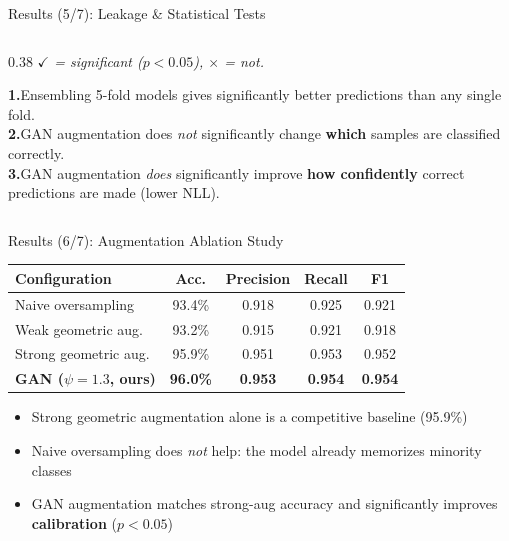 \documentclass[aspectratio=169]{beamer}
\begin{document}
\begin{frame}{Results (5/7): Leakage \& Statistical Tests}
\begin{columns}[T]
\begin{column}{0.38\textwidth}
      \vspace{0.1em}
      {\tiny\itshape \textcolor{mygreen}{$\checkmark$} = significant ($p<0.05$),
      \textcolor{myred}{$\times$} = not.}
      \vspace{0.4em}
      \begin{block}{}
        \scriptsize
        \textbf{1.}\;Ensembling 5-fold models gives significantly better predictions than any single fold.\\[2pt]
        \textbf{2.}\;GAN augmentation does \emph{not} significantly change \textbf{which} samples are classified correctly.\\[2pt]
        \textbf{3.}\;GAN augmentation \emph{does} significantly improve \textbf{how confidently} correct predictions are made (lower NLL).
      \end{block}
    \end{column}
  \end{columns}
\end{frame}

\begin{frame}{Results (6/7): Augmentation Ablation Study}
  \begin{center}
  \begin{tabular}{lcccc}
    \toprule
    Configuration & Acc. & Precision & Recall & F1 \\
    \midrule
    Naive oversampling          & 93.4\% & 0.918 & 0.925 & 0.921 \\
    Weak geometric aug.         & 93.2\% & 0.915 & 0.921 & 0.918 \\
    Strong geometric aug.       & 95.9\% & 0.951 & 0.953 & 0.952 \\
    \midrule
    \textbf{GAN ($\psi=1.3$, ours)} & \textbf{96.0\%} & \textbf{0.953} & \textbf{0.954} & \textbf{0.954} \\
    \bottomrule
  \end{tabular}
  \end{center}
  \vspace{0.4em}
  \begin{itemize}\small
    \item Strong geometric augmentation alone is a competitive baseline (95.9\%)
    \item Naive oversampling does \emph{not} help: the model already memorizes minority classes
    \item GAN augmentation matches strong-aug accuracy and significantly improves \textbf{calibration} ($p < 0.05$)
  \end{itemize}
\end{frame}
\end{document}
